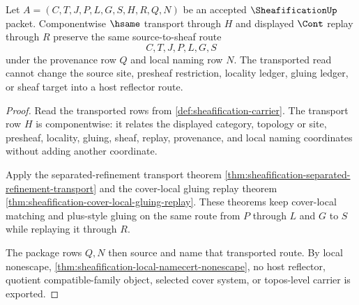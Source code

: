 \begin{theorem}
\label{thm:sheafification-sheaf-target-transport}
Let $A=(C,T,J,P,L,G,S,H,R,Q,N)$ be an accepted $\SheafificationUp$ packet. Componentwise $\hsame$ transport through $H$ and displayed $\Cont$ replay through $R$ preserve the same source-to-sheaf route
$$
C,T,J,P,L,G,S
$$
under the provenance row $Q$ and local naming row $N$. The transported read cannot change the source site, presheaf restriction, locality ledger, gluing ledger, or sheaf target into a host reflector route.
\end{theorem}
\begin{proof}
Read the transported rows from \autoref{def:sheafification-carrier}. The transport row $H$ is componentwise: it relates the displayed category, topology or site, presheaf, locality, gluing, sheaf, replay, provenance, and local naming coordinates without adding another coordinate.

Apply the separated-refinement transport theorem \autoref{thm:sheafification-separated-refinement-transport} and the cover-local gluing replay theorem \autoref{thm:sheafification-cover-local-gluing-replay}. These theorems keep cover-local matching and plus-style gluing on the same route from $P$ through $L$ and $G$ to $S$ while replaying it through $R$.

The package rows $Q,N$ then source and name that transported route. By local nonescape, \autoref{thm:sheafification-local-namecert-nonescape}, no host reflector, quotient compatible-family object, selected cover system, or topos-level carrier is exported.
\end{proof}

